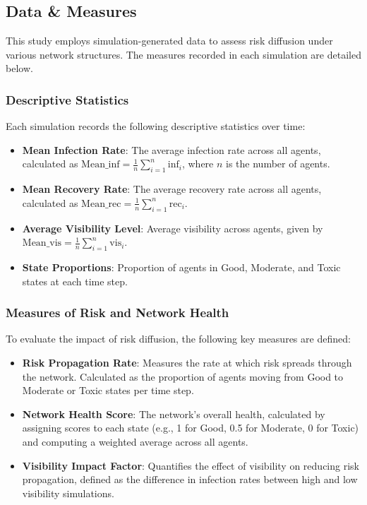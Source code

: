 \documentclass{article}
\begin{document}
\subsection{Data \& Measures}
This study employs simulation-generated data to assess risk diffusion under various network structures. The measures recorded in each simulation are detailed below.

\subsubsection{Descriptive Statistics}
Each simulation records the following descriptive statistics over time:
\begin{itemize}
    \item \textbf{Mean Infection Rate}: The average infection rate across all agents, calculated as \( \text{Mean\_inf} = \frac{1}{n} \sum_{i=1}^n \text{inf}_i \), where \( n \) is the number of agents.
    \item \textbf{Mean Recovery Rate}: The average recovery rate across all agents, calculated as \( \text{Mean\_rec} = \frac{1}{n} \sum_{i=1}^n \text{rec}_i \).
    \item \textbf{Average Visibility Level}: Average visibility across agents, given by \( \text{Mean\_vis} = \frac{1}{n} \sum_{i=1}^n \text{vis}_i \).
    \item \textbf{State Proportions}: Proportion of agents in Good, Moderate, and Toxic states at each time step.
\end{itemize}

\subsubsection{Measures of Risk and Network Health}
To evaluate the impact of risk diffusion, the following key measures are defined:
\begin{itemize}
    \item \textbf{Risk Propagation Rate}: Measures the rate at which risk spreads through the network. Calculated as the proportion of agents moving from Good to Moderate or Toxic states per time step.
    \item \textbf{Network Health Score}: The network's overall health, calculated by assigning scores to each state (e.g., 1 for Good, 0.5 for Moderate, 0 for Toxic) and computing a weighted average across all agents.
    \item \textbf{Visibility Impact Factor}: Quantifies the effect of visibility on reducing risk propagation, defined as the difference in infection rates between high and low visibility simulations.
\end{itemize}
\end{document}
